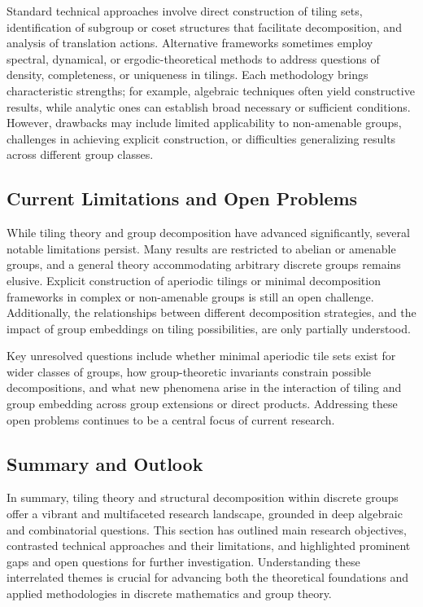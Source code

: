 \documentclass[sigconf]{acmart}
\begin{document}
Standard technical approaches involve direct construction of tiling sets, identification of subgroup or coset structures that facilitate decomposition, and analysis of translation actions. Alternative frameworks sometimes employ spectral, dynamical, or ergodic-theoretical methods to address questions of density, completeness, or uniqueness in tilings. Each methodology brings characteristic strengths; for example, algebraic techniques often yield constructive results, while analytic ones can establish broad necessary or sufficient conditions. However, drawbacks may include limited applicability to non-amenable groups, challenges in achieving explicit construction, or difficulties generalizing results across different group classes.

\subsection*{Current Limitations and Open Problems}

While tiling theory and group decomposition have advanced significantly, several notable limitations persist. Many results are restricted to abelian or amenable groups, and a general theory accommodating arbitrary discrete groups remains elusive. Explicit construction of aperiodic tilings or minimal decomposition frameworks in complex or non-amenable groups is still an open challenge. Additionally, the relationships between different decomposition strategies, and the impact of group embeddings on tiling possibilities, are only partially understood.

Key unresolved questions include whether minimal aperiodic tile sets exist for wider classes of groups, how group-theoretic invariants constrain possible decompositions, and what new phenomena arise in the interaction of tiling and group embedding across group extensions or direct products. Addressing these open problems continues to be a central focus of current research.

\subsection*{Summary and Outlook}

In summary, tiling theory and structural decomposition within discrete groups offer a vibrant and multifaceted research landscape, grounded in deep algebraic and combinatorial questions. This section has outlined main research objectives, contrasted technical approaches and their limitations, and highlighted prominent gaps and open questions for further investigation. Understanding these interrelated themes is crucial for advancing both the theoretical foundations and applied methodologies in discrete mathematics and group theory.
\end{document}
